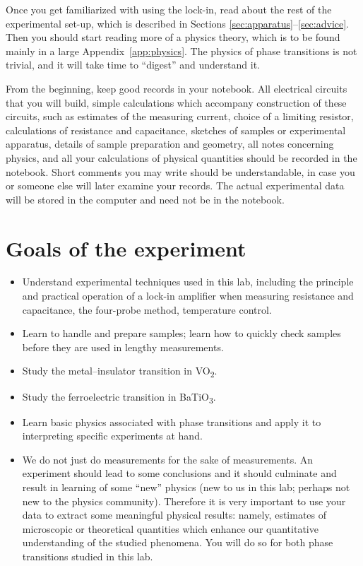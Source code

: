 \documentclass[11pt,a4paper]{article}
\newcommand{\VOtwo}{VO\textsubscript{2}}
\newcommand{\BTO}{BaTiO\textsubscript{3}}
\begin{document}
Once you get familiarized with using the lock-in, read about the rest of the
experimental set-up, which is described in Sections
\ref{sec:apparatus}--\ref{sec:advice}. Then you should start reading more of a
physics theory, which is to be found mainly in a large
Appendix~\ref{app:physics}. The physics of phase transitions is not trivial,
and it will take time to ``digest'' and understand it.

From the beginning, keep good records in your notebook. All electrical circuits
that you will build, simple calculations which accompany construction of these
circuits, such as estimates of the measuring current, choice of a limiting
resistor, calculations of resistance and capacitance, sketches of samples or
experimental apparatus, details of sample preparation and geometry, all notes
concerning physics, and all your calculations of physical quantities should be
recorded in the notebook. Short comments you may write should be
understandable, in case you or someone else will later examine your records. The actual experimental
data will be stored in the computer and need not be in the notebook.

\section{Goals of the experiment}\label{sec:prepare}

\begin{itemize}
  \item Understand experimental techniques used in this lab, including the
        principle and practical operation of a lock-in amplifier when measuring
        resistance and capacitance, the four-probe method, temperature control.
  \item Learn to handle and prepare samples; learn how to quickly check samples
        before they are used in lengthy measurements.
  \item Study the metal--insulator transition in \VOtwo.
  \item Study the ferroelectric transition in \BTO.
  \item Learn basic physics associated with phase transitions and apply it to
        interpreting specific experiments at hand.
  \item We do not just do measurements for the sake of measurements. An
        experiment should lead to some conclusions and it should culminate and
        result in learning of some ``new'' physics (new to us in this lab;
        perhaps not new to the physics community). Therefore it is very
        important to use your data to extract some meaningful physical results:
        namely, estimates of
        microscopic or theoretical quantities which enhance our quantitative
        understanding of the studied phenomena. You will do so for both phase
        transitions studied in this lab.
\end{itemize}
\end{document}
